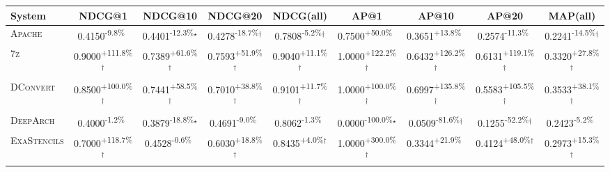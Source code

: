\begin{table}[htbp]
\centering
\renewcommand{\arraystretch}{1.2}
\begin{tabular}{l|cccc|cccc}
\hline
System & NDCG@1 & NDCG@10 & NDCG@20 & NDCG(all) & AP@1 & AP@10 & AP@20 & MAP(all) \\ \hline
\textsc{Apache} & \cellcolor{red!30}0.4150\textsuperscript{-9.8\%}$^{\,\,\,}$ & \cellcolor{red!30}0.4401\textsuperscript{-12.3\%}$^\star$ & \cellcolor{red!30}0.4278\textsuperscript{-18.7\%}$^\dagger$ & \cellcolor{red!30}0.7808\textsuperscript{-5.2\%}$^\dagger$ & \cellcolor{green!30}0.7500\textsuperscript{+50.0\%}$^{\,\,\,}$ & \cellcolor{green!30}0.3651\textsuperscript{+13.8\%}$^{\,\,\,}$ & \cellcolor{red!30}0.2574\textsuperscript{-11.3\%}$^{\,\,\,}$ & \cellcolor{red!30}0.2241\textsuperscript{-14.5\%}$^\dagger$ \\
\textsc{7z} & \cellcolor{green!30}0.9000\textsuperscript{+111.8\%}$^\dagger$ & \cellcolor{green!30}0.7389\textsuperscript{+61.6\%}$^\dagger$ & \cellcolor{green!30}0.7593\textsuperscript{+51.9\%}$^\dagger$ & \cellcolor{green!30}0.9040\textsuperscript{+11.1\%}$^\dagger$ & \cellcolor{green!30}1.0000\textsuperscript{+122.2\%}$^\dagger$ & \cellcolor{green!30}0.6432\textsuperscript{+126.2\%}$^\dagger$ & \cellcolor{green!30}0.6131\textsuperscript{+119.1\%}$^\dagger$ & \cellcolor{green!30}0.3320\textsuperscript{+27.8\%}$^\dagger$ \\
\textsc{DConvert} & \cellcolor{green!30}0.8500\textsuperscript{+100.0\%}$^\dagger$ & \cellcolor{green!30}0.7441\textsuperscript{+58.5\%}$^\dagger$ & \cellcolor{green!30}0.7010\textsuperscript{+38.8\%}$^\dagger$ & \cellcolor{green!30}0.9101\textsuperscript{+11.7\%}$^\dagger$ & \cellcolor{green!30}1.0000\textsuperscript{+100.0\%}$^\dagger$ & \cellcolor{green!30}0.6997\textsuperscript{+135.8\%}$^\dagger$ & \cellcolor{green!30}0.5583\textsuperscript{+105.5\%}$^\dagger$ & \cellcolor{green!30}0.3533\textsuperscript{+38.1\%}$^\dagger$ \\
\textsc{DeepArch} & \cellcolor{red!30}0.4000\textsuperscript{-1.2\%}$^{\,\,\,}$ & \cellcolor{red!30}0.3879\textsuperscript{-18.8\%}$^\star$ & \cellcolor{red!30}0.4691\textsuperscript{-9.0\%}$^{\,\,\,}$ & \cellcolor{red!30}0.8062\textsuperscript{-1.3\%}$^{\,\,\,}$ & \cellcolor{red!30}0.0000\textsuperscript{-100.0\%}$^\star$ & \cellcolor{red!30}0.0509\textsuperscript{-81.6\%}$^\dagger$ & \cellcolor{red!30}0.1255\textsuperscript{-52.2\%}$^\dagger$ & \cellcolor{red!30}0.2423\textsuperscript{-5.2\%}$^{\,\,\,}$ \\
\textsc{ExaStencils} & \cellcolor{green!30}0.7000\textsuperscript{+118.7\%}$^\dagger$ & \cellcolor{red!30}0.4528\textsuperscript{-0.6\%}$^{\,\,\,}$ & \cellcolor{green!30}0.6030\textsuperscript{+18.8\%}$^\dagger$ & \cellcolor{green!30}0.8435\textsuperscript{+4.0\%}$^\dagger$ & \cellcolor{green!30}1.0000\textsuperscript{+300.0\%}$^\dagger$ & \cellcolor{green!30}0.3344\textsuperscript{+21.9\%}$^{\,\,\,}$ & \cellcolor{green!30}0.4124\textsuperscript{+48.0\%}$^\dagger$ & \cellcolor{green!30}0.2973\textsuperscript{+15.3\%}$^\dagger$ \\

\end{tabular}
\end{table}
